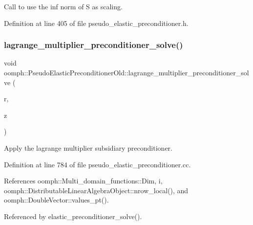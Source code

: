 Call to use the inf norm of S as scaling. 



Definition at line 405 of file pseudo\+\_\+elastic\+\_\+preconditioner.\+h.

\mbox{\label{classoomph_1_1PseudoElasticPreconditionerOld_a02d8d2a2ad34030238f7f65964f91a08}} 
\subsubsection{\texorpdfstring{lagrange\+\_\+multiplier\+\_\+preconditioner\+\_\+solve()}{lagrange\_multiplier\_preconditioner\_solve()}}
{\footnotesize\ttfamily void oomph\+::\+Pseudo\+Elastic\+Preconditioner\+Old\+::lagrange\+\_\+multiplier\+\_\+preconditioner\+\_\+solve (\begin{DoxyParamCaption}\item[{const \hyperlink{classoomph_1_1DoubleVector}{Double\+Vector} \&}]{r,  }\item[{\hyperlink{classoomph_1_1DoubleVector}{Double\+Vector} \&}]{z }\end{DoxyParamCaption})\hspace{0.3cm}{\ttfamily [private]}}



Apply the lagrange multiplier subsidiary preconditioner. 



Definition at line 784 of file pseudo\+\_\+elastic\+\_\+preconditioner.\+cc.



References oomph\+::\+Multi\+\_\+domain\+\_\+functions\+::\+Dim, i, oomph\+::\+Distributable\+Linear\+Algebra\+Object\+::nrow\+\_\+local(), and oomph\+::\+Double\+Vector\+::values\+\_\+pt().



Referenced by elastic\+\_\+preconditioner\+\_\+solve().

\mbox{\label{classoomph_1_1PseudoElasticPreconditionerOld_a20b548d07e0f4116f59444ccb69d980f}} 
